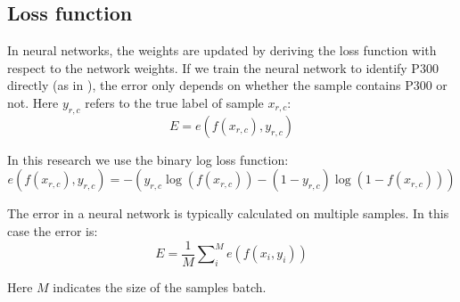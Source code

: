 \documentclass[
12pt, %
english, %
doublespacing, %
headsepline, %
]{MastersDoctoralThesis} %
\begin{document}
\subsection{Loss function}
In neural networks, the weights are updated by deriving the loss function with respect to the network weights. If we train the neural network to identify P300 directly (as in \cite{P300_CNN}), the error only depends on whether the sample contains P300 or not. Here $y_{r,c}$ refers to the true label of sample $x_{r,c}$:
\begin{equation}
E = e\left( {f\left( {{x_{r,c}}} \right),{y_{r,c}}} \right)
\end{equation} 

In this research we use the binary log loss function:
\begin{equation}\label{eq:binary_log_loss}
e\left( {f\left( {{x_{r,c}}} \right),{y_{r,c}}} \right) =  - \left( {{y_{r,c}}\log \left( {f\left( {{x_{r,c}}} \right)} \right) - \left( {1 - {y_{r,c}}} \right)\log \left( {1 - f\left( {{x_{r,c}}} \right)} \right)} \right)
\end{equation} 


The error in a neural network is typically calculated on multiple samples. In this case the error is:
\begin{equation}\label{eq:mini_batch_loss}
E = \frac{1}{M}\sum\nolimits_i^M {e\left( {f\left( {{x_i},{y_i}} \right)} \right)}
\end{equation}

Here $M$ indicates the size of the samples batch.
\end{document}
